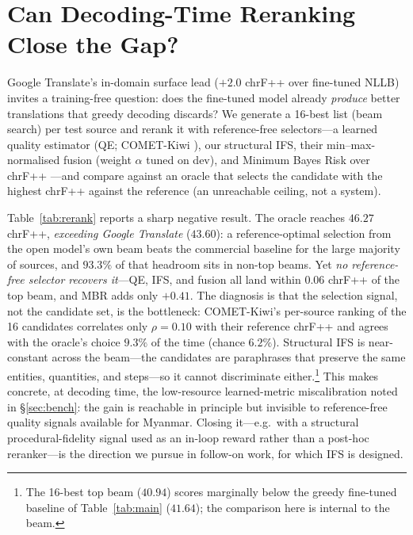 \documentclass[11pt]{article}
\begin{document}
\section{Can Decoding-Time Reranking Close the Gap?}\label{sec:rerank}
Google Translate's in-domain surface lead ($+2.0$ chrF++ over fine-tuned NLLB) invites a
training-free question: does the fine-tuned model already \emph{produce} better translations
that greedy decoding discards? We generate a 16-best list (beam search) per test source and
rerank it with reference-free selectors---a learned quality estimator (QE; COMET-Kiwi
\citep{rei2022cometkiwi}), our structural IFS, their min--max-normalised fusion (weight
$\alpha$ tuned on dev), and Minimum Bayes Risk over chrF++
\citep{eikema2020mbr,freitag2022mbr}---and compare against an oracle that selects the
candidate with the highest chrF++ against the reference (an unreachable ceiling, not a system).



Table~\ref{tab:rerank} reports a sharp negative result. The oracle reaches $46.27$ chrF++,
\emph{exceeding Google Translate} ($43.60$): a reference-optimal selection from the open
model's own beam beats the commercial baseline for the large majority of sources, and
$93.3\%$ of that headroom sits in non-top beams. Yet \emph{no reference-free selector
recovers it}---QE, IFS, and fusion all land within $0.06$ chrF++ of the top beam, and MBR adds
only $+0.41$. The diagnosis is that the selection signal, not the candidate set, is the
bottleneck: COMET-Kiwi's per-source ranking of the 16 candidates correlates only
$\rho{=}0.10$ with their reference chrF++ and agrees with the oracle's choice $9.3\%$ of the
time (chance $6.2\%$). Structural IFS is near-constant across the beam---the candidates are
paraphrases that preserve the same entities, quantities, and steps---so it cannot discriminate
either.\footnote{The 16-best top beam ($40.94$) scores marginally below the greedy fine-tuned
baseline of Table~\ref{tab:main} ($41.64$); the comparison here is internal to the beam.}
This makes concrete, at decoding time, the low-resource learned-metric miscalibration noted in
\S\ref{sec:bench}: the gain is reachable in principle but invisible to reference-free quality
signals available for Myanmar. Closing it---e.g.\ with a structural procedural-fidelity signal
used as an in-loop reward rather than a post-hoc reranker---is the direction we pursue in
follow-on work, for which IFS is designed.
\end{document}
